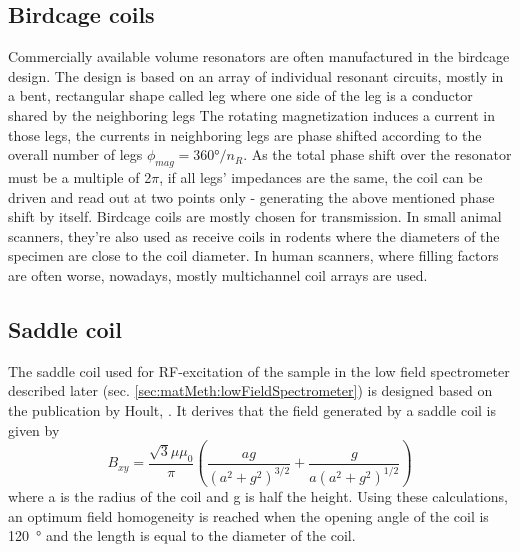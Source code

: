             \subsection{Birdcage coils}
            Commercially available volume resonators are often manufactured in the birdcage design. The design is based on an array of individual resonant circuits, mostly in a bent, rectangular shape called leg where one side of the leg is a conductor shared by the neighboring legs The rotating magnetization induces a current in those legs, the currents in neighboring legs are phase shifted according to the overall number of legs $\phi_{mag} = 360\si{\degree}/n_R$. As the total phase shift over the resonator must be a multiple of 2$\pi$, if all legs' impedances are the same, the coil can be driven and read out at two points only - generating the above mentioned phase shift by itself. Birdcage coils are mostly chosen for transmission. In small animal scanners, they're also used as receive coils in rodents where the diameters of the specimen are close to the coil diameter. In human scanners, where filling factors are often worse, nowadays, mostly multichannel coil arrays are used.
            \subsection{Saddle coil}
            \label{sec:theory:saddleCoils}
            The saddle coil used for RF-excitation of the sample in the low field spectrometer described later (sec. \ref{sec:matMeth:lowFieldSpectrometer}) is designed based on the publication by Hoult, \cite{hoult_signal--noise_1976}. It derives that the field generated by a saddle coil is given by
            \begin{equation}
                B_{xy} = \frac{\sqrt 3 \mu\mu_0}{\pi}\left(\frac{ag}{(a^2+g^2)^{3/2}}+\frac{g}{a(a^2+g^2)^{1/2}}\right)
            \end{equation}
            where a is the radius of the coil and g is half the height. Using these calculations, an optimum field homogeneity is reached when the opening angle of the coil is \SI{120}{\degree} and the length is equal to the diameter of the coil.
